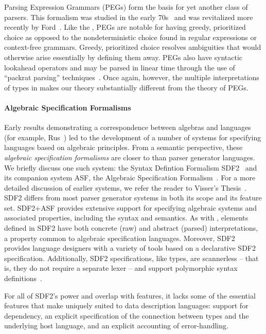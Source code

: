 Parsing Expression Grammars (PEGs) form the basis for yet another
class of parsers. This formalism was studied in the early
70s~\cite{birman+:parsing} and was revitalized more recently by
Ford~\cite{ford:pegs}.  Like the \ddc{}, PEGs are notable for
having greedy, prioritized 
choice as opposed to the nondeterministic choice found in regular
expressions or context-free grammars.  Greedy, prioritized choice
resolves ambiguities that would otherwise arise essentially
by defining them away.  PEGs also have syntactic lookahead
operators and may be parsed in linear time through the use of
``packrat parsing'' techniques~\cite{ford:packrat,grimm:packrat}.
Once again, however, the multiple interpretations of types in \ddc{} makes our
theory substantially different from the theory of PEGs.

\paragraph*{Algebraic Specification Formalisms}

Early results demonstrating a correspondence between algebras and languages (for example, Rus~\cite{rus:algebra}) led to the development of a number of systems for specifying languages based on algebraic principles. From a semantic perspective, these \textit{algebraic specification formalisms} are
closer to \ddc{} than parser generator languages. We briefly
discuss one such system: the Syntax Defintion Formalism
SDF2~\cite{visser:thesis} and its companion system ASF, the Algebraic
Specification Formalism~\cite{asfchapter}. For a more detailed discussion of 
earlier systems, we refer the reader to Visser's
Thesis~\cite{visser:thesis}. SDF2 differs from most parser generator
systems in both its scope and its feature set. SDF2+ASF provides
extensive support for specifying algebraic systems and associated
properties, including the syntax and semantics. As with \ddc{},
elements defined in SDF2 have both concrete (raw) and abstract
(parsed) interpretations, a property common to algebraic specification
languages. Moreover, SDF2 provides language designers with a variety
of tools based on a declarative SDF2 specification. Additionally, SDF2
specifications, like \ddc{} types, are scannerless -- that is, they do not
require a separate lexer -- and support polymorphic syntax
definitions~\cite{Vis98.psd}.

For all of SDF2's power and overlap with \ddc{} features, it
lacks some of the essential features that make \ddc{} uniquely
suited to data description languages: support for dependency, an
explicit specification of the connection between \ddc{} types and the
underlying host language, and an explicit accounting of 
error-handling.

